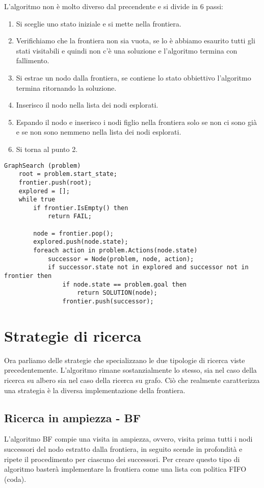 L'algoritmo non \`e molto diverso dal precendente e si divide in 6 passi:
\begin{enumerate}
	\item Si sceglie uno stato iniziale e si mette nella frontiera.
	\item Verifichiamo che la frontiera non sia vuota, se lo \`e abbiamo esaurito tutti gli
	      stati visitabili e quindi non c'\`e una soluzione e l'algoritmo termina con
	      fallimento.
	\item Si estrae un nodo dalla frontiera, se contiene lo stato obbiettivo l'algoritmo
	      termina ritornando la soluzione.
	\item Inserisco il nodo nella lista dei nodi esplorati.
	\item Espando il nodo e inserisco i nodi figlio nella frontiera solo se non ci sono gi\`a
	      e se non sono nemmeno nella lista dei nodi esplorati.
	\item Si torna al punto 2.
\end{enumerate}

\begin{lstlisting}[style=pseudo-style]
GraphSearch (problem)
	root = problem.start_state;
	frontier.push(root);
	explored = [];
	while true
		if frontier.IsEmpty() then
			return FAIL;
		
		node = frontier.pop();
		explored.push(node.state);
		foreach action in problem.Actions(node.state)
			successor = Node(problem, node, action);
			if successor.state not in explored and successor not in frontier then
				if node.state == problem.goal then
					return SOLUTION(node);
				frontier.push(successor);
\end{lstlisting}

\section{Strategie di ricerca}
Ora parliamo delle strategie che specializzano le due tipologie di ricerca viste precedentemente.
L'algoritmo rimane sostanzialmente lo stesso, sia nel caso della ricerca su albero sia nel caso
della ricerca su grafo. Ci\`o che realmente caratterizza una strategia \`e la diversa implementazione
della frontiera.

\subsection{Ricerca in ampiezza - BF}
L'algoritmo BF compie una visita in ampiezza, ovvero, visita prima tutti i nodi
successori del nodo estratto dalla frontiera, in seguito scende in profondit\`a e ripete il procedimento
per ciascuno dei successori. Per creare questo tipo di algoritmo baster\`a implementare la frontiera come una lista
con politica FIFO (coda).

